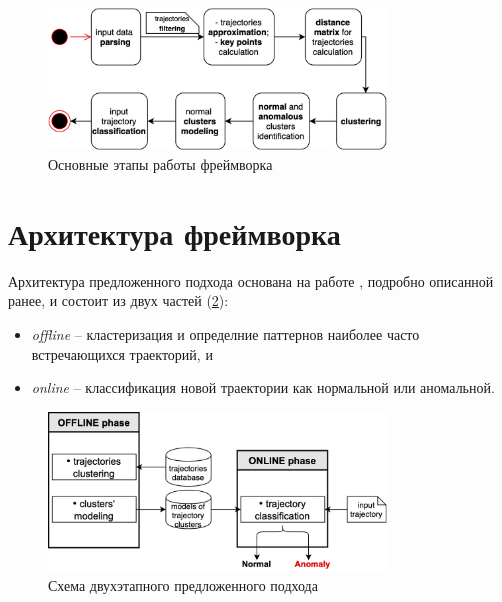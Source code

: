 \begin{figure}[!htb]
	\centering{}
	\includegraphics[width=0.8\textwidth]{images/flowchart.png}
	\caption{Основные этапы работы фреймворка}
	\label{fig:flowchart}
\end{figure}

\section{Архитектура фреймворка}

Архитектура предложенного подхода основана на работе \cite{inproceedings:7_related_work}, подробно описанной ранее, и состоит из двух частей (\ref{fig:str}):

\begin{itemize}
	\item \textit{offline} -- кластеризация и определние паттернов наиболее часто встречающихся траекторий, и
	\item \textit{online} -- классификация новой траектории как нормальной или аномальной.
\end{itemize}

\begin{figure}[!htb]
	\centering{}
	\includegraphics[width=0.8\textwidth]{images/str.png}
	\caption{Схема двухэтапного предложенного подхода}
	\label{fig:str}
\end{figure}

